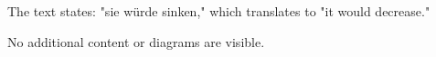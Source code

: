 The text states: "sie würde sinken," which translates to "it would decrease."  

No additional content or diagrams are visible.